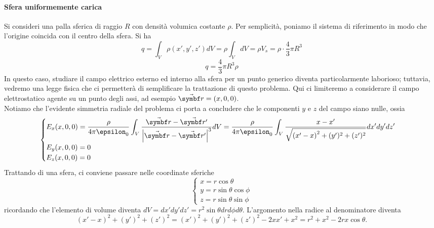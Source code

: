 \paragraph{Sfera uniformemente carica}%
Si consideri una palla sferica di raggio $R$ con densità volumica costante $\rho$. Per semplicità, poniamo il sistema di riferimento in modo che l'origine coincida con il centro della sfera. Si ha
\begin{equation*}
	q=\int_{V}\rho(x',y',z')dV=\rho\int_{V}dV=\rho V_s=\rho \cdot \frac{4}{3}\pi R^3
\end{equation*}
\begin{equation}
	q=\frac{4}{3}\pi R^3\rho
\end{equation}
In questo caso, studiare il campo elettrico esterno ed interno alla sfera per un punto generico diventa particolarmente laborioso; tuttavia, vedremo una legge fisica che ci permetterà di semplificare la trattazione di questo problema. Qui ci limiteremo a considerare il campo elettrostatico agente su un punto degli assi, ad esempio $\vba{r}=\left(x,0,0\right)$.\\
Notiamo che l'evidente simmetria radiale del problema ci porta a concludere che le componenti $y$ e $z$ del campo siano nulle, ossia
\begin{equation*}
	\begin{cases}
		\displaystyle E_x(x,0,0)=\frac{\rho}{4\pi\epsilon_0}\int_V\frac{\vba{r}-\vba{r'}}{\abs{\vba{r}-\vba{r'}}^3}dV=\frac{\rho}{4\pi\epsilon_0}\int_V\frac{x-x'}{\sqrt{\left(x'-x\right)^2+(y')^2+(z')^2}}dx'dy'dz'\\
		E_y(x,0,0)=0\\
		E_z(x,0,0)=0
	\end{cases}
\end{equation*}
Trattando di una sfera, ci conviene passare nelle coordinate sferiche
\begin{equation*}
	\begin{cases}
		x=r\cos\theta\\
		y=r\sin\theta\cos\phi\\
		z=r\sin\theta\sin\phi
	\end{cases}
\end{equation*}
ricordando che l'elemento di volume diventa $dV=dx'dy'dz'=r^2\sin\theta drd\phi d\theta$. L'argomento nella radice al denominatore diventa
\begin{equation*}
	\left(x'-x\right)^2+(y')^2+(z')^2=(x')^2+(y')^2+(z')^2-2xx'+x^2=r^2+x^2-2rx\cos\theta.
\end{equation*}
